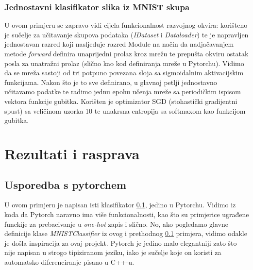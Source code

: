 \documentclass[zavrsnirad]{fer}
\begin{document}


\subsection{Jednostavni klasifikator slika iz MNIST skupa}
\label{pog:klasifikator}

U ovom primjeru se zapravo vidi cijela funkcionalnost razvojnog okvira: korišteno je sučelje za učitavanje skupova podataka (\textit{IDataset} i \textit{Dataloader}) te je napravljen jednostavan razred koji nasljeđuje razred Module na način da nadjačavanjem metode \textit{forward} definira unaprijedni prolaz kroz mrežu te prepušta okviru ostatak posla za unatražni prolaz (slično kao kod definiranja mreže u Pytorchu). Vidimo da se mreža sastoji od tri potpuno povezana sloja sa sigmoidalnim aktivacijskim funkcijama. Nakon što je to sve definirano, u glavnoj petlji jednostavno učitavamo podatke te radimo jednu epohu učenja mreže sa periodičkim ispisom vektora funkcije gubitka. Korišten je optimizator SGD (stohastički gradijentni spust) sa veličinom uzorka 10 te unakrsna entropija sa softmaxom kao funkcijom gubitka.

\chapter{Rezultati i rasprava}
\label{pog:rezultati_i_rasprava}

\section{Usporedba s pytorchem}
U ovom primjeru je napisan isti klasifikator \ref{pog:klasifikator}, jedino u Pytorchu. Vidimo iz koda da Pytorch naravno ima više funkcionalnosti, kao što su primjerice ugrađene funckije za prebacivanje u \textit{one-hot} zapis i slično. No, ako pogledamo glavne definicije klase \textit{MNISTClassifier} iz ovog i prethodnog \ref{pog:klasifikator} primjera, vidimo odakle je došla inspiracija za ovaj projekt. Pytorch je jedino malo elegantniji zato što nije napisan u strogo tipiziranom jeziku, iako je sučelje koje on koristi za automatsko diferenciranje pisano u C++-u.


\pagebreak
\end{document}
